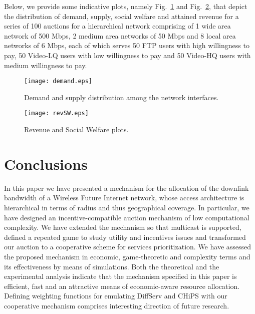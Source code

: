 \documentclass[a4paper]{article}
\begin{document}
Below, we provide some indicative plots, namely Fig.~\ref{fig:demand}
and Fig.~\ref{fig:revSW}, that depict the distribution of demand,
supply, social welfare and attained revenue for a series of 100 auctions for 
a hierarchical network comprising of
1 wide area network of 500 Mbps, 2 medium area networks of 50 Mbps and
8 local area networks of 6 Mbps, each of which serves 50 FTP users with
high willingness to pay, 50 Video-LQ users with low willingness to pay and
50 Video-HQ users with medium willingness to pay.


\begin{figure}[htbp]
	\centering\texttt{[image: demand.eps]}
	\caption{Demand and supply distribution among the network interfaces.}
	\label{fig:demand}
\end{figure}

\begin{figure}[htbp]
	\centering\texttt{[image: revSW.eps]}
	\caption{Revenue and Social Welfare plots.}
	\label{fig:revSW}
\end{figure}

\section{Conclusions}\label{sec:concl}

In this paper we have presented a mechanism for the allocation of the downlink 
bandwidth of a Wireless Future Internet network, whose access architecture is 
hierarchical in terms of radius and thus geographical coverage.  
In particular, we have designed an incentive-compatible auction mechanism 
of low computational complexity. We have extended the mechanism so that 
multicast is supported, defined a repeated game to study utility and incentives
issues and transformed our auction to a cooperative 
scheme for services prioritization. We have assessed the proposed mechanism
in economic, game-theoretic and complexity terms and its effectiveness by 
means of simulations.
Both the theoretical and the experimental analysis indicate that the mechanism 
specified in this paper is  efficient, fast and an attractive means of 
economic-aware resource allocation. 
Defining weighting functions for 
emulating DiffServ and CHiPS with
our cooperative mechanism comprises interesting direction of future research.
\end{document}
